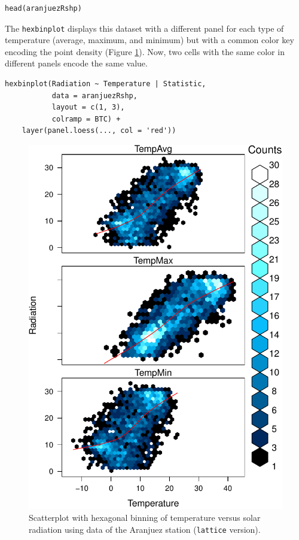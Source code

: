 \lstset{language=r,label= ,caption= ,captionpos=b,numbers=none}
\begin{lstlisting}
head(aranjuezRshp)
\end{lstlisting}

The \texttt{hexbinplot} displays this dataset with a different panel for
each type of temperature (average, maximum, and minimum) but with a
common color key encoding the point density (Figure
\ref{fig:aranjuezHexbin}). Now, two cells with the same color in
different panels encode the same value. 


\lstset{language=r,label= ,caption= ,captionpos=b,numbers=none}
\begin{lstlisting}
hexbinplot(Radiation ~ Temperature | Statistic,
           data = aranjuezRshp,
           layout = c(1, 3),
           colramp = BTC) +
    layer(panel.loess(..., col = 'red'))
\end{lstlisting}

\begin{figure}[htbp]
\centering
\includegraphics[width=.9\linewidth]{figs/aranjuezHexbinplot.pdf}
\caption{Scatterplot with hexagonal binning of temperature versus solar radiation using data of the Aranjuez station (\texttt{lattice} version). \label{fig:aranjuezHexbin}}
\end{figure}

